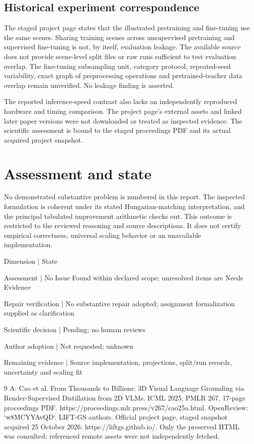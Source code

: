 \documentclass[10pt]{article}
\begin{document}
\subsection*{Historical experiment correspondence}
The staged project page states that the illustrated pretraining and fine-tuning use the same scenes. Sharing training scenes across unsupervised pretraining and supervised fine-tuning is not, by itself, evaluation leakage. The available source does not provide scene-level split files or raw runs sufficient to test evaluation overlap. The fine-tuning subsampling unit, category protocol, repeated-seed variability, exact graph of preprocessing operations and pretrained-teacher data overlap remain unverified. No leakage finding is asserted.\par
The reported inference-speed contrast also lacks an independently reproduced hardware and timing comparison. The project page’s external assets and linked later paper versions were not downloaded or treated as inspected evidence. The scientific assessment is bound to the staged proceedings PDF and its actual acquired project snapshot.\par
\section*{Assessment and state}
No demonstrated substantive problem is numbered in this report. The inspected formulation is coherent under its stated Hungarian-matching interpretation, and the principal tabulated improvement arithmetic checks out. This outcome is restricted to the reviewed reasoning and source descriptions. It does not certify empirical correctness, universal scaling behavior or an unavailable implementation.\par
Dimension | State\par
Assessment | No Issue Found within declared scope; unresolved items are Needs Evidence\par
Repair verification | No substantive repair adopted; assignment formalization supplied as clarification\par
Scientific decision | Pending; no human reviews\par
Author adoption | Not requested; unknown\par
Remaining evidence | Source implementation, projections, split/run records, uncertainty and scaling fit\par
9 A. Cao et al. From Thousands to Billions: 3D Visual Language Grounding via Render-Supervised Distillation from 2D VLMs. ICML 2025, PMLR 267, 17-page proceedings PDF. https://proceedings.mlr.press/v267/cao25a.html. OpenReview: `w8MCYYAvQD`. LIFT-GS authors. Official project page, staged snapshot acquired 25 October 2026. https://liftgs.github.io/. Only the preserved HTML was consulted; referenced remote assets were not independently fetched.\par
\end{document}
